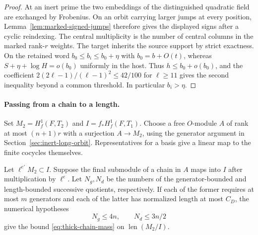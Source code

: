 \begin{proof}
At an inert prime the two embeddings of the distinguished quadratic field are exchanged by Frobenius. On an orbit carrying larger jumps at every position, Lemma~\ref{lem:marked-signed-jumps} therefore gives the displayed signs after a cyclic reindexing. The central multiplicity is the number of central columns in the marked rank-\(r\) weights. The target inherits the source support by strict exactness. On the retained word
\(b_0\le b_i\le b_0+\eta\) with \(b_0=b+O(t)\), whereas
\(S+\eta+\log H=o(b_0)\) uniformly in the host. Thus
\(h\le b_0+o(b_0)\), and the coefficient
\(2(2\ell-1)/(\ell-1)^2\le 42/100\) for \(\ell\ge11\)
gives the second inequality beyond a common threshold.
In particular \(b_i>\eta\).
\end{proof}

\paragraph{Passing from a chain to a length.}
Set \(M_2=H^1_f(F,T_2)\) and \(I=f_*H^1_f(F,T_1)\).
Choose a free \(O\)-module \(A\) of rank at most \((n+1)r\)
with a surjection \(A\to M_2\), using the generator argument in
Section~\ref{sec:inert-long-orbit}. Representatives for a basis
give a linear map to the finite cocycles themselves.
\begin{lemma}
Let \(\ell^{e'}M_2\subset I\). Suppose the final submodule of a
chain in \(A\) maps into \(I\) after multiplication by \(\ell^e\).
Let \(N_g,N_d\) be the numbers of the generator-bounded and length-bounded successive quotients, respectively. If each of the former requires at most \(m\) generators and each of the latter has normalized length at most \(C_D\), the numerical hypotheses
\[
 N_g\le4n,\qquad N_d\le3n/2
\]
give the bound \eqref{eq:thick-chain-mass} on \(\operatorname{len}(M_2/I)\).
\end{lemma}
